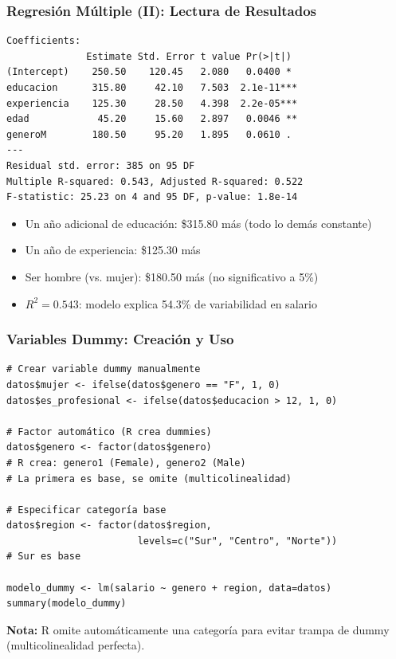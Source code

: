 \documentclass[aspectratio=169,11pt]{beamer}
\begin{document}
\begin{frame}[fragile]
  \frametitle{Regresión Múltiple (II): Lectura de Resultados}

  \tiny
  \begin{lstlisting}
Coefficients:
              Estimate Std. Error t value Pr(>|t|)
(Intercept)    250.50    120.45   2.080   0.0400 *
educacion      315.80     42.10   7.503  2.1e-11***
experiencia    125.30     28.50   4.398  2.2e-05***
edad            45.20     15.60   2.897   0.0046 **
generoM        180.50     95.20   1.895   0.0610 .
---
Residual std. error: 385 on 95 DF
Multiple R-squared: 0.543, Adjusted R-squared: 0.522
F-statistic: 25.23 on 4 and 95 DF, p-value: 1.8e-14
  \end{lstlisting}

  \small
  \begin{itemize}
    \item Un año adicional de educación: \$315.80 más (todo lo demás constante)
    \item Un año de experiencia: \$125.30 más
    \item Ser hombre (vs. mujer): \$180.50 más (no significativo a 5\%)
    \item $R^2 = 0.543$: modelo explica 54.3\% de variabilidad en salario
  \end{itemize}
\end{frame}

\begin{frame}[fragile]
  \frametitle{Variables Dummy: Creación y Uso}

  \begin{lstlisting}
# Crear variable dummy manualmente
datos$mujer <- ifelse(datos$genero == "F", 1, 0)
datos$es_profesional <- ifelse(datos$educacion > 12, 1, 0)

# Factor automático (R crea dummies)
datos$genero <- factor(datos$genero)
# R crea: genero1 (Female), genero2 (Male)
# La primera es base, se omite (multicolinealidad)

# Especificar categoría base
datos$region <- factor(datos$region,
                       levels=c("Sur", "Centro", "Norte"))
# Sur es base

modelo_dummy <- lm(salario ~ genero + region, data=datos)
summary(modelo_dummy)
  \end{lstlisting}

  \small
  \textbf{Nota:} R omite automáticamente una categoría para evitar trampa de dummy (multicolinealidad perfecta).
\end{frame}
\end{document}
